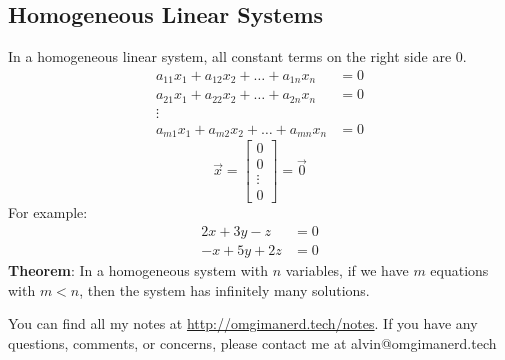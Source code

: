 \documentclass[letterpaper, 12pt]{math}
\begin{document}
\subsection*{Homogeneous Linear Systems}
In a homogeneous linear system, all constant terms on the right side are 0.
\begin{align*}
  a_{11}x_1+a_{12}x_2+\dots+a_{1n}x_n &= 0 \\
  a_{21}x_1+a_{22}x_2+\dots+a_{2n}x_n &= 0 \\
  \vdots \\
  a_{m1}x_1+a_{m2}x_2+\dots+a_{mn}x_n &= 0
\end{align*}
\[ \vec{x} = \begin{bmatrix}0 \\ 0 \\ \vdots \\ 0\end{bmatrix} = \vec{0} \]
For example:
\begin{align*}
  2x+3y-z &= 0 \\
  -x+5y+2z &= 0
\end{align*}
\textbf{Theorem}: In a homogeneous system with \( n \) variables, if we have
\( m \) equations with \( m < n \), then the system has infinitely many
solutions.

\begin{center}
  You can find all my notes at \url{http://omgimanerd.tech/notes}. If you have
  any questions, comments, or concerns, please contact me at
  alvin@omgimanerd.tech
\end{center}
\end{document}
